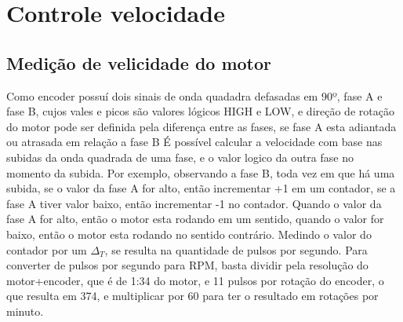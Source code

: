 \chapter{Controle velocidade}

\section{Medição de velicidade do motor}

Como encoder possuí dois sinais de onda quadadra defasadas em 90º, fase A e fase B, cujos vales e picos são valores lógicos HIGH e LOW, 
e direção de rotação do motor pode ser definida pela diferença entre as fases, se fase A esta adiantada ou atrasada em relação a fase B
É possível calcular a velocidade com base nas subidas da onda quadrada de uma fase, e o valor logico da outra fase no momento da subida.
Por exemplo,  observando a fase B, toda vez em que há uma subida, se o valor da fase A for alto, então incrementar +1 em um contador, se a fase A tiver valor baixo, então incrementar -1 no contador.
Quando o valor da fase A for alto, então o motor esta rodando em um sentido,  quando o valor  for baixo, então o motor esta rodando no sentido contrário.
Medindo o valor do contador por um $\Delta_{T}$, se resulta na quantidade de pulsos por segundo.
Para converter de pulsos por segundo para RPM, basta dividir pela resolução do motor+encoder,  que é de 1:34 do motor, e 11 pulsos por rotação do encoder, o que resulta em 374,
e multiplicar por 60 para ter o resultado em rotações por minuto.


    


